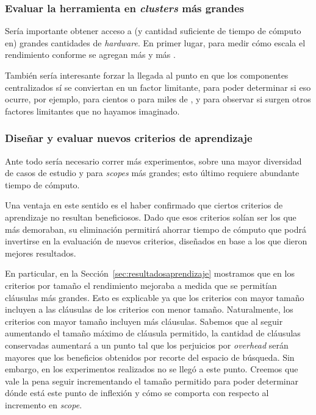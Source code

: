 \subsubsection{Evaluar la herramienta en \emph{clusters} más grandes}

Sería importante obtener acceso a (y cantidad suficiente de tiempo de cómputo
en) grandes cantidades de \emph{hardware}. En primer lugar, para medir cómo
escala el rendimiento conforme se agregan más y más \ws.

También sería interesante forzar la llegada al punto en que los componentes
centralizados sí se conviertan en un factor limitante, para poder determinar
si eso ocurre, por ejemplo, para cientos o para miles de \ws, y para observar
si surgen otros factores limitantes que no hayamos imaginado.


\subsubsection{Diseñar y evaluar nuevos criterios de aprendizaje}

Ante todo sería necesario correr más experimentos, sobre una mayor diversidad
de casos de estudio y para \emph{scopes} más grandes; esto último requiere
abundante tiempo de cómputo.

Una ventaja en este sentido es el haber confirmado que ciertos criterios de
aprendizaje no resultan beneficiosos. Dado que esos criterios solían ser los
que más demoraban, su eliminación permitirá ahorrar tiempo de cómputo que
podrá invertirse en la evaluación de nuevos criterios, diseñados en base a los
que dieron mejores resultados.

En particular, en la Sección~\ref{sec:resultadosaprendizaje} mostramos que en
los criterios por tamaño el rendimiento mejoraba a medida que se permitían
cláusulas más grandes. Esto es explicable ya que los criterios con mayor
tamaño incluyen a las cláusulas de los criterios con menor tamaño.
Naturalmente, los criterios con mayor tamaño incluyen más cláusulas. Sabemos
que al seguir aumentando el tamaño máximo de cláusula permitido, la cantidad
de cláusulas conservadas aumentará a un punto tal que los perjuicios por
\emph{overhead} serán mayores que los beneficios obtenidos por recorte del
espacio de búsqueda. Sin embargo, en los experimentos realizados no se llegó a
este punto. Creemos que vale la pena seguir incrementando el tamaño permitido
para poder determinar dónde está este punto de inflexión y cómo se comporta
con respecto al incremento en \emph{scope}.


